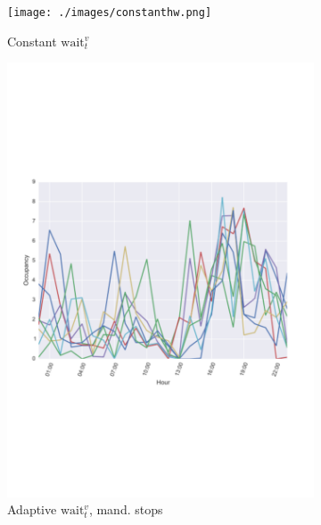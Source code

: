\documentclass[12pt,a4paper]{article}
\begin{document}
\begin{figure}
  \centering
\begin{subfigure}[b]{0.445\textwidth}
  \texttt{[image: ./images/constanthw.png]}
  \caption{Constant $\text{wait}_t^{v}$}
  \label{constant}
\end{subfigure}
\begin{subfigure}[b]{0.42\textwidth}
  \includegraphics[width=\linewidth]{./images/hwmax10simu}
  \caption{Adaptive $\text{wait}_t^{v}$, mand. stops}
  \label{adaptiveload}
\end{subfigure}
\begin{subfigure}[b]{0.49\textwidth}

\end{subfigure}
\end{figure}
\end{document}
